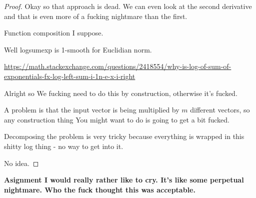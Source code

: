\documentclass{article}
\begin{document}
\begin{proof}
	Okay so that approach is dead. We can even look at the second derivative and that is even more of a fucking nightmare than the first.
	
	Function composition I suppose. 
	
	Well logsumexp is 1-smooth for Euclidian norm.
	
	\url{https://math.stackexchange.com/questions/2418554/why-is-log-of-sum-of-exponentials-fx-log-left-sum-i-1n-e-x-i-right} 
	
	
	Alright so We fucking need to do this by construction, otherwise it's fucked.
	
	A problem is that the input vector is being multiplied by $m$ different vectors, so any construction thing You might want to do is going to get a bit fucked. 
	
	Decomposing the problem is very tricky because everything is wrapped in this shitty log thing - no way to get into it. 
	
	No idea.
	
\end{proof}

\textbf{Asignment I would really rather like to cry. It's like some perpetual nightmare. Who the fuck thought this was acceptable. }
	
	
	
	
	
	
	
	
	
	














	
\end{document}
